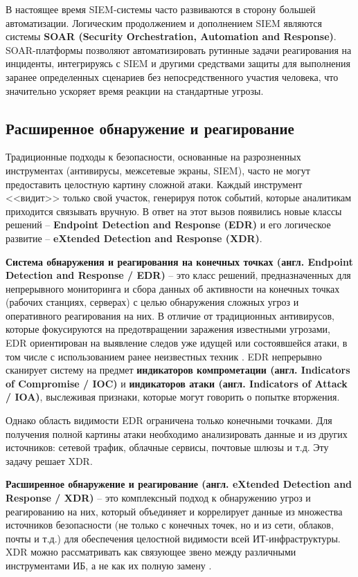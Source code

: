 В настоящее время SIEM-системы часто развиваются в сторону большей автоматизации. Логическим продолжением и дополнением SIEM являются системы \textbf{SOAR (Security Orchestration, Automation and Response)}. SOAR-платформы позволяют автоматизировать рутинные задачи реагирования на инциденты, интегрируясь с SIEM и другими средствами защиты для выполнения заранее определенных сценариев без непосредственного участия человека, что значительно ускоряет время реакции на стандартные угрозы.

\subsection{Расширенное обнаружение и реагирование}

Традиционные подходы к безопасности, основанные на разрозненных инструментах (антивирусы, межсетевые экраны, SIEM), часто не могут предоставить целостную картину сложной атаки. Каждый инструмент <<видит>> только свой участок, генерируя поток событий, которые аналитикам приходится связывать вручную. В ответ на этот вызов появились новые классы решений -- \textbf{Endpoint Detection and Response (EDR)} и его логическое развитие -- \textbf{eXtended Detection and Response (XDR)}.


\textbf{Система обнаружения и реагирования на конечных точках (англ. Endpoint Detection and Response / EDR)} -- это класс решений, предназначенных для непрерывного мониторинга и сбора данных об активности на конечных точках (рабочих станциях, серверах) с целью обнаружения сложных угроз и оперативного реагирования на них. В отличие от традиционных антивирусов, которые фокусируются на предотвращении заражения известными угрозами, EDR ориентирован на выявление следов уже идущей или состоявшейся атаки, в том числе с использованием ранее неизвестных техник \cite{KasperskyEDR}. EDR непрерывно сканирует систему на предмет \textbf{индикаторов компрометации (англ. Indicators of Compromise / IOC)} и \textbf{индикаторов атаки (англ. Indicators of Attack / IOA)}, выслеживая признаки, которые могут говорить о попытке вторжения.

Однако область видимости EDR ограничена только конечными точками. Для получения полной картины атаки необходимо анализировать данные и из других источников: сетевой трафик, облачные сервисы, почтовые шлюзы и т.д. Эту задачу решает XDR.

\textbf{Расширенное обнаружение и реагирование (англ. eXtended Detection and Response / XDR)} -- это комплексный подход к обнаружению угроз и реагированию на них, который объединяет и коррелирует данные из множества источников безопасности (не только с конечных точек, но и из сети, облаков, почты и т.д.) для обеспечения целостной видимости всей ИТ-инфраструктуры. XDR можно рассматривать как связующее звено между различными инструментами ИБ, а не как их полную замену \cite{PositiveTechnologiesXDR}.


